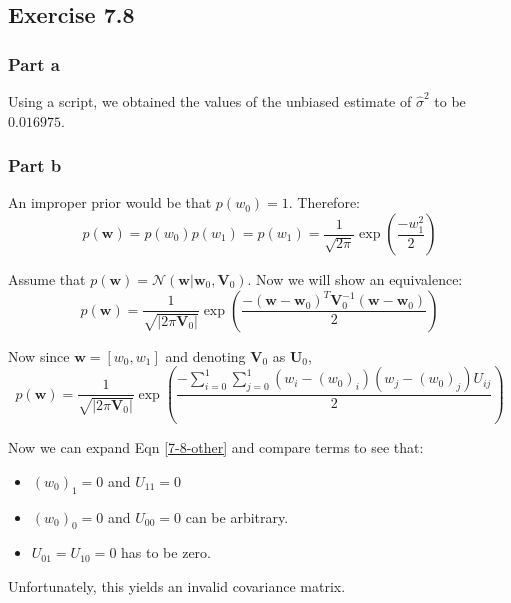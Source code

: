 \documentclass{article}
\newcommand{\vct}[1]{\mathbf{#1}}
\begin{document}
\subsection*{Exercise 7.8}
\subsubsection*{Part a}
Using a script, we obtained the values of the unbiased estimate of \(\hat{\sigma}^{2}\) to be \(0.016975\).

\subsubsection*{Part b}
\begin{flushleft}
An improper prior would be that \(p(w_{0}) = 1\). Therefore:
\begin{equation}
p(\vct{w}) = p(w_{0})p(w_{1}) = p(w_{1}) = \frac{1}{\sqrt{2\pi}}\exp\left(\frac{-w_{1}^{2}}{2}\right)
\end{equation}

Assume that \(p(\vct{w}) = \mathcal{N}(\vct{w} | \vct{w}_{0}, \vct{V}_{0})\). Now we will show an equivalence:
\begin{equation}
p(\vct{w}) = \frac{1}{\sqrt{|2\pi\vct{V}_{0}|}}\exp\left(\frac{-(\vct{w} - \vct{w}_{0})^{T}\vct{V}_{0}^{-1}(\vct{w} - \vct{w}_{0})}{2}\right)
\end{equation}

Now since \(\vct{w} = [w_{0}, w_{1}]\) and denoting \(\vct{V}_{0}\) as \(\vct{U}_{0}\),
\begin{equation}
\label{7-8-other}
p(\vct{w}) = \frac{1}{\sqrt{|2\pi\vct{V}_{0}|}}\exp\left(\frac{-\displaystyle\sum_{i=0}^{1}\sum_{j=0}^{1}(w_{i} - (w_{0})_{i})(w_{j} - (w_{0})_{j})U_{ij}}{2}\right)
\end{equation}

Now we can expand Eqn \ref{7-8-other} and compare terms to see that:
\begin{itemize}
\item \((w_{0})_{1} = 0\) and \(U_{11} = 0\)
\item \((w_{0})_{0} = 0\) and \(U_{00} = 0\) can be arbitrary.
\item \(U_{01} = U_{10} = 0\) has to be zero.
\end{itemize}

Unfortunately, this yields an invalid covariance matrix.
\end{flushleft}
\end{document}
